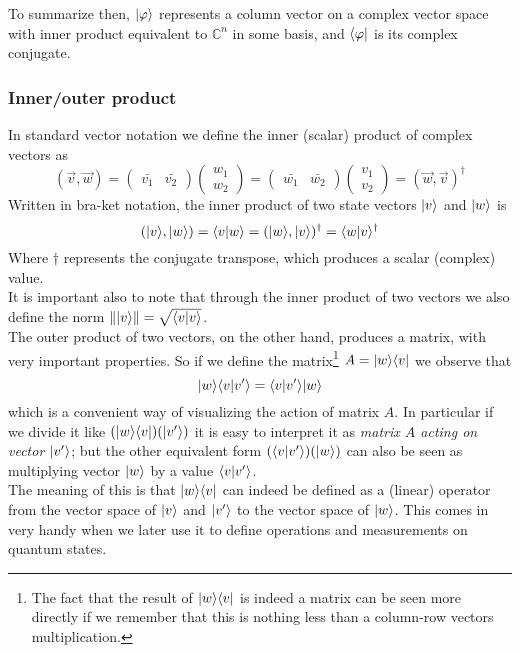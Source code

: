 	To summarize then, $|\varphi \rangle$ represents a column vector on a complex vector space with inner product equivalent to $\mathbb{C}^n$ in some basis, and $\langle \varphi|$ is its complex conjugate.
	
	
	\subsubsection*{Inner/outer product}
	In standard vector notation we define the inner (scalar) product of complex vectors as
	$$ ( \vec{v}, \vec{w} ) =  \begin{pmatrix} \bar{v_1} & \bar{v_2}\end{pmatrix} \begin{pmatrix} w_1 \\ w_2 \end{pmatrix} = \begin{pmatrix} \bar{w_1} & \bar{w_2}\end{pmatrix} \begin{pmatrix} v_1 \\ v_2 \end{pmatrix} = ( \vec{w}, \vec{v} )^{\dagger}$$
	Written in bra-ket notation, the inner product of two state vectors $|v \rangle$ and $|w \rangle$ is
	$$ ( |v \rangle , |w \rangle ) = \langle v|w\rangle = (|w \rangle , |v \rangle )^{\dagger} = \langle w|v\rangle^{\dagger} $$
	Where $\dagger$ represents the conjugate transpose,	which produces a scalar (complex) value.\\ %
	
	It is important also to note that through the inner product of two vectors we also define the norm $\||v \rangle\|  =  \sqrt{\langle v|v\rangle} $.\\
	
	
	The outer product of two vectors, on the other hand, produces a matrix, with very important properties. So if we define the matrix\footnote{The fact that the result of  $ |w \rangle\langle v| $ is indeed a matrix can be seen more directly if we remember that this is nothing less than a column-row vectors multiplication.} $A =  |w \rangle\langle v| $ we observe that
	$$ |w \rangle\langle v|v'\rangle = \langle v|v'\rangle|w \rangle $$	
	which is a convenient way of visualizing the action of matrix $A$. In particular if we divide it like $(|w \rangle\langle v|) (|v' \rangle) $ it is easy to interpret it as \textit{matrix $A$ acting on vector $|v' \rangle$}; but the other equivalent form $(\langle v|v'\rangle)(|w \rangle)$ can also be seen as multiplying vector $|w \rangle$ by a value $\langle v|v'\rangle$. \\
	The meaning of this is that $|w \rangle\langle v|$ can indeed be defined as a (linear) operator from the vector space of $|v \rangle$ and $|v' \rangle$ to the vector space of $|w \rangle$. This comes in very handy when we later use it to define operations and measurements on quantum states.\\ %
	
